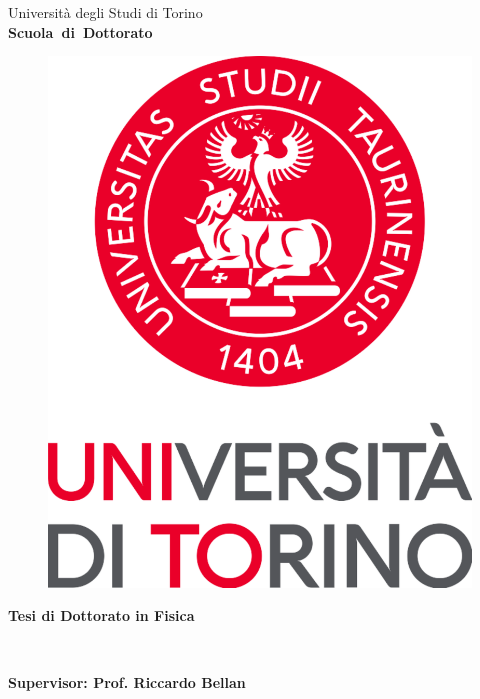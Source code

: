 \begin{titlepage}

\begin{center}
\begin{large}
Universit\`a degli Studi di Torino \\
{\bf Scuola~di~Dottorato}
\end{large}
\end{center}
\hrulefill

\vspace{0.5cm}
\begin{figure}[h]
  \centering
  \includegraphics[width=.2\textheight]{Figures/logoUniversita.pdf}
\end{figure}

\vspace{1cm}
\begin{center}
{\Large \bf Tesi di Dottorato in Fisica}
\end{center}

\vspace{1cm}
\begin{center}
  {\LARGE \bf \thetitle}\\
  \vspace{1cm}
         {\Large \bf \theauthor}
\end{center}

\vspace*{\fill}

{\large \bf Supervisor: Prof. Riccardo Bellan}

\vspace{1cm}
\end{titlepage}
